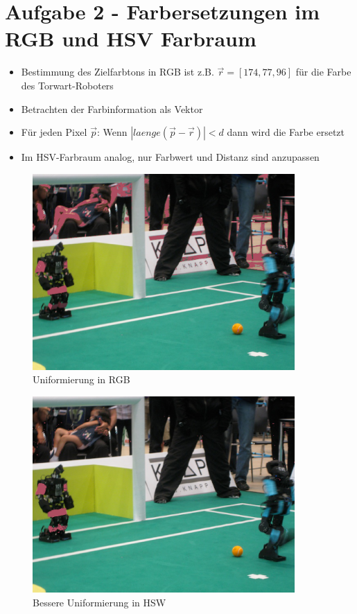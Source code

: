\section*{Aufgabe 2 - Farbersetzungen im RGB und HSV Farbraum}
\begin{itemize}
\item Bestimmung des Zielfarbtons in RGB ist z.B. $\vec{r} = [174,77,96]$ f\"ur 
      die Farbe des Torwart-Roboters
\item Betrachten der Farbinformation als Vektor
\item F\"ur jeden Pixel $\vec{p}$: Wenn $|laenge(\vec{p}-\vec{r})|< d$ dann
      wird die Farbe ersetzt
\item Im HSV-Farbraum analog, nur Farbwert und Distanz sind anzupassen
\end{itemize}

\begin{figure}[H]
\begin{center}
\includegraphics[width=100mm]{u08/dist_rgb.eps}
\end{center}
\caption{Uniformierung in RGB}
\end{figure}

\begin{figure}[H]
\begin{center}
\includegraphics[width=100mm]{u08/dist_hsv.eps}
\end{center}
\caption{Bessere Uniformierung in HSW}
\end{figure}

